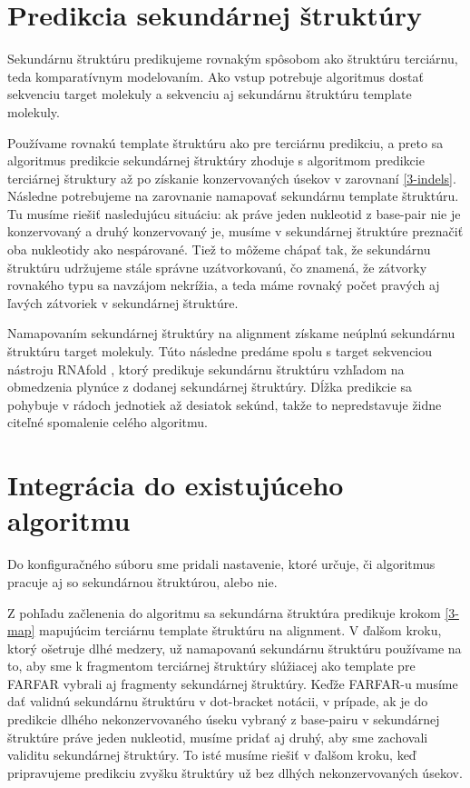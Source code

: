 \section{Predikcia sekundárnej štruktúry}
Sekundárnu štruktúru predikujeme rovnakým spôsobom ako štruktúru terciárnu, teda komparatívnym modelovaním. Ako vstup potrebuje algoritmus dostať sekvenciu target molekuly a sekvenciu aj sekundárnu štruktúru template molekuly. 


\indent  Používame rovnakú template štruktúru ako pre terciárnu predikciu, a preto sa algoritmus predikcie sekundárnej štruktúry zhoduje s algoritmom predikcie terciárnej štruktury až po získanie konzervovaných úsekov v zarovnaní \ref{3-indels}. Následne potrebujeme na zarovnanie namapovať sekundárnu template štruktúru. Tu musíme riešiť nasledujúcu situáciu: ak práve jeden nukleotid z base-pair nie je konzervovaný a druhý konzervovaný je, musíme v sekundárnej štruktúre preznačiť oba nukleotidy ako nespárované. Tiež to môžeme chápať tak, že sekundárnu štruktúru udržujeme stále správne uzátvorkovanú, čo znamená, že zátvorky rovnakého typu sa navzájom nekrížia, a teda máme rovnaký počet pravých aj ľavých zátvoriek v sekundárnej štruktúre.


\indent Namapovaním sekundárnej štruktúry na alignment získame neúplnú sekundárnu štruktúru target molekuly. Túto následne predáme spolu s target sekvenciou nástroju RNAfold \cite{RNAfold}, ktorý predikuje sekundárnu štruktúru vzhľadom na obmedzenia plynúce z dodanej sekundárnej štruktúry. Dĺžka predikcie sa pohybuje v rádoch jednotiek až desiatok sekúnd, takže to nepredstavuje židne citeľné spomalenie celého algoritmu. 


\section{Integrácia do existujúceho algoritmu}
Do konfiguračného súboru sme pridali nastavenie, ktoré určuje, či algoritmus pracuje aj so sekundárnou štruktúrou, alebo nie.


\indent Z pohľadu začlenenia do algoritmu sa sekundárna štruktúra predikuje krokom \ref{3-map} mapujúcim terciárnu template štruktúru na alignment. V ďalšom kroku, ktorý ošetruje dlhé medzery, už namapovanú sekundárnu štruktúru používame na to, aby sme k fragmentom terciárnej štruktúry slúžiacej ako template pre FARFAR vybrali aj fragmenty sekundárnej štruktúry. Keďže FARFAR-u musíme dať validnú sekundárnu štruktúru v dot-bracket notácii, v prípade, ak je do predikcie dlhého nekonzervovaného úseku vybraný z base-pairu v sekundárnej štruktúre práve jeden nukleotid, musíme pridať aj druhý, aby sme zachovali validitu sekundárnej štruktúry. To isté musíme riešiť v ďalšom kroku, keď pripravujeme predikciu zvyšku štruktúry už bez dlhých nekonzervovaných úsekov. 


